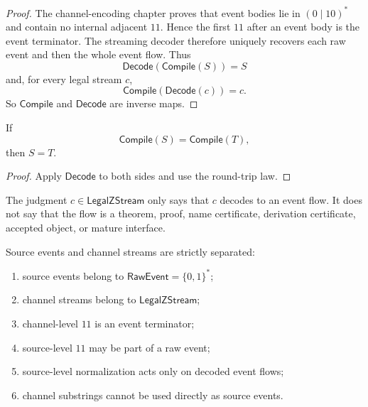 \begin{proof}
The channel-encoding chapter proves that event bodies lie in $(0\mid 10)^{\ast}$ and contain no internal adjacent $11$. Hence the first $11$ after an event body is the event terminator. The streaming decoder therefore uniquely recovers each raw event and then the whole event flow. Thus
$$
  \mathsf{Decode}(\mathsf{Compile}(S))=S
$$
and, for every legal stream $c$,
$$
  \mathsf{Compile}(\mathsf{Decode}(c))=c.
$$
So $\mathsf{Compile}$ and $\mathsf{Decode}$ are inverse maps.
\end{proof}

\begin{corollary}
\label{cor:main-theorems-channel-code-lossless}
If
$$
  \mathsf{Compile}(S)=\mathsf{Compile}(T),
$$
then $S=T$.
\end{corollary}

\begin{proof}
Apply $\mathsf{Decode}$ to both sides and use the round-trip law.
\end{proof}

\begin{corollary}
\label{cor:main-theorems-code-not-proof}
The judgment $c\in\mathsf{LegalZStream}$ only says that $c$ decodes to an event flow. It does not say that the flow is a theorem, proof, name certificate, derivation certificate, accepted object, or mature interface.
\end{corollary}

\begin{theorem}
\label{thm:main-theorems-source-channel-separation}
Source events and channel streams are strictly separated:
\begin{enumerate}
\item source events belong to $\mathsf{RawEvent}=\{0,1\}^{\ast}$;
\item channel streams belong to $\mathsf{LegalZStream}$;
\item channel-level $11$ is an event terminator;
\item source-level $11$ may be part of a raw event;
\item source-level normalization acts only on decoded event flows;
\item channel substrings cannot be used directly as source events.
\end{enumerate}
\end{theorem}

